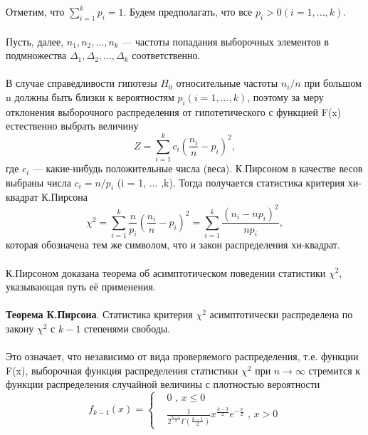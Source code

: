 \documentclass[../body.tex]{subfiles}
\begin{document}
\\\\
Отметим, что $\sum_{i=1}^{k}{p_{i}} = 1$.
Будем предполагать, что все $p_{i} > 0 (i = 1, ... ,k).$
\\\\
Пусть, далее, $n_{1},n_{2}, ... ,n_{k}$ — частоты попадания выборочных элементов в подмножества $\Delta_{1},\Delta_{2}, ... ,\Delta_{k}$ соответственно.
\\\\
В случае справедливости гипотезы $H_{0}$ относительные частоты $n_{i}/n$ при большом n должны быть близки к вероятностям $p_{i} (i = 1, ... ,k)$, поэтому за меру отклонения выборочного распределения от гипотетического с функцией F(x) естественно выбрать величину
\begin{equation}
	Z = \sum_{i = 1}^{k}{c_{i}(\frac{n_{i}}{n} - p_{i})^{2}}, 
	\label{Z}
\end{equation}
где $c_{i}$ — какие-нибудь положительные числа (веса). К.Пирсоном в качестве весов выбраны числа $c_{i} = n/p_{i}$ (i = 1, ... ,k). Тогда получается статистика критерия хи-квадрат К.Пирсона
\begin{equation}
	\chi^{2} = \sum_{i = 1}^{k}{\frac{n}{p_{i}}(\frac{n_{i}}{n} - p_{i})^{2}} = \sum_{i = 1}^{k}{\frac{(n_{i} - np_{i})^{2}}{np_{i}}}, 
	\label{chi_2}
\end{equation}
которая обозначена тем же символом, что и закон распределения хи-квадрат.
\\\\
К.Пирсоном доказана теорема об асимптотическом поведении статистики $\chi^{2}$, указывающая путь её применения.
\\\\
\textbf{Теорема К.Пирсона}. Статистика критерия $\chi^{2}$ асимптотически распределена по закону $\chi^{2}$ с $k-1$ степенями свободы.
\\\\
Это означает, что независимо от вида проверяемого распределения, т.е. функции F(x), выборочная функция распределения статистики $\chi^{2}$ при $n \rightarrow \infty$  стремится к функции распределения случайной величины с плотностью вероятности 
\begin{equation}
	f_{k - 1}(x) = 
	\begin{cases}
	& 0 \text{ , } x  \leq 0  \\ 
	& \frac{1}{2^{\frac{k-1}{2}}\Gamma(\frac{k-1}{2})}x^{\frac{k-3}{2}}e^{-\frac{x}{2}}
	\text{ , } x>0 
	\end{cases}
	\label{f_k-1}
\end{equation}
\end{document}
